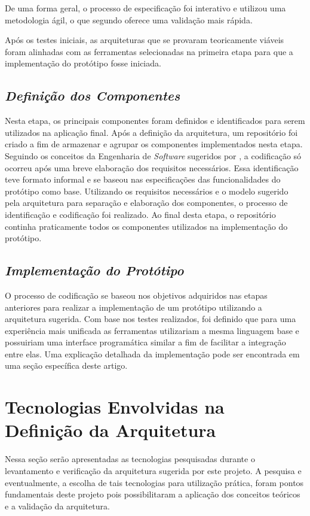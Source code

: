De uma forma geral, o processo de especificação foi interativo e utilizou uma metodologia ágil, o que segundo \cite{pressman2011} oferece uma validação mais rápida.

Após os testes iniciais, as arquiteturas que se provaram teoricamente viáveis foram alinhadas com as ferramentas selecionadas na primeira etapa para que a implementação do protótipo fosse iniciada.

\subsection{{\it Definição dos Componentes}}

Nesta etapa, os principais componentes foram definidos e identificados para serem utilizados na aplicação final.
Após a definição da arquitetura, um repositório foi criado a fim de armazenar e agrupar os componentes implementados nesta etapa. Seguindo os conceitos da Engenharia de \textit{Software} sugeridos por \cite{pressman2011}, a codificação só ocorreu após uma breve elaboração dos requisitos necessários. Essa identificação teve formato informal e se baseou nas especificações das funcionalidades do protótipo como base. Utilizando os requisitos necessários e o modelo sugerido pela arquitetura para separação e elaboração dos componentes, o processo de identificação e codificação foi realizado. Ao final desta etapa, o repositório continha praticamente todos os componentes utilizados na implementação do protótipo.

\subsection{{\it Implementação do Protótipo}}

O processo de codificação se baseou nos objetivos adquiridos nas etapas anteriores para realizar a implementação de um protótipo utilizando a arquitetura sugerida. Com base nos testes realizados, foi definido que para uma experiência mais unificada as ferramentas utilizariam a mesma linguagem base e possuiriam uma interface programática similar a fim de facilitar a integração entre elas. Uma explicação detalhada da implementação pode ser encontrada em uma seção específica deste artigo.

\section{\esp Tecnologias Envolvidas na Definição da Arquitetura}
Nessa seção serão apresentadas as tecnologias pesquisadas durante o levantamento e verificação da arquitetura sugerida por este projeto. A pesquisa e eventualmente, a escolha de tais tecnologias para utilização prática, foram pontos fundamentais deste projeto pois possibilitaram a aplicação dos conceitos teóricos e a validação da arquitetura. 

